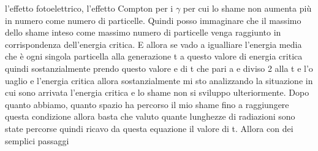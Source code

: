 {l'effetto fotoelettrico, l'effetto Compton per i $\gamma$ per cui lo shame non aumenta più in numero come numero di particelle. Quindi posso immaginare che il massimo dello shame inteso come massimo numero di particelle venga raggiunto in corrispondenza dell'energia critica. E allora se vado a igualliare l'energia media che è ogni singola particella alla generazione t a questo valore di energia critica quindi sostanzialmente prendo questo valore e di t che pari a e diviso 2 alla t e l'o uaglio e l'energia critica allora sostanzialmente mi sto analizzando la situazione in cui sono arrivata l'energia critica e lo shame non si sviluppo ulteriormente. Dopo quanto abbiamo, quanto spazio ha percorso il mio shame fino a raggiungere questa condizione allora basta che valuto quante lunghezze di radiazioni sono state percorse quindi ricavo da questa equazione il valore di t. Allora con dei semplici passaggi 

}
